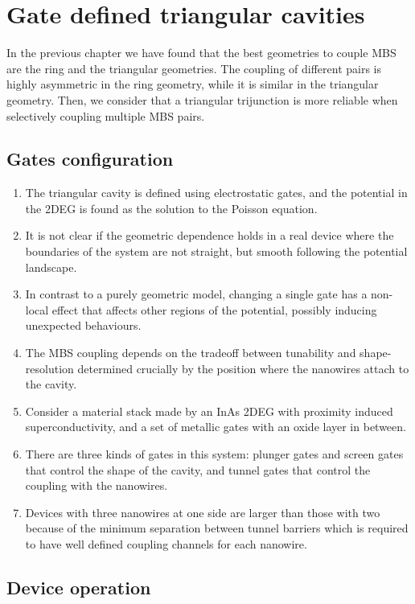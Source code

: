\chapter{Gate defined triangular cavities}

In the previous chapter we have found that the best geometries to couple MBS are the ring and the triangular geometries.
The coupling of different pairs is highly asymmetric in the ring geometry, while it is similar in the triangular geometry.
Then, we consider that a triangular trijunction is more reliable when selectively coupling multiple MBS pairs.



\section{Gates configuration}
\begin{enumerate}
\item The triangular cavity is defined using electrostatic gates, and the potential in the 2DEG is found as the solution to the Poisson equation.
\item It is not clear if the geometric dependence holds in a real device where the boundaries of the system are not straight, but smooth following the potential landscape.
\item In contrast to a purely geometric model, changing a single gate has a non-local effect that affects other regions of the potential, possibly inducing unexpected behaviours.
\item The MBS coupling depends on the tradeoff between tunability and shape-resolution determined crucially by the position where the nanowires attach to the cavity.
\item Consider a material stack made by an InAs 2DEG with proximity induced superconductivity, and a set of metallic gates with an oxide layer in between.
\item There are three kinds of gates in this system: plunger gates and screen gates that control the shape of the cavity, and tunnel gates that control the coupling with the nanowires.
\item Devices with three nanowires at one side are larger than those with two because of the minimum separation between tunnel barriers which is required to have well defined coupling channels for each nanowire.
\end{enumerate}

\section{Device operation}
